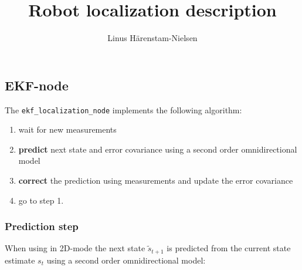 \documentclass[a4paper]{article}
\begin{document}
\title{Robot localization description}
\author {Linus Härenstam-Nielsen}
\maketitle


\subsection*{EKF-node}
The \texttt{ekf\_localization\_node} implements the following algorithm:
\begin{enumerate}
	\item wait for new measurements
	\item \textbf{predict} next state and error covariance using a second order omnidirectional model 
	\item \textbf{correct} the prediction using measurements and update the error covariance
	\item go to step 1.
\end{enumerate}

\subsubsection*{Prediction step}
When using  in 2D-mode the next state $\tilde{s}_{t+1}$ is predicted from the current state estimate $s_t$ using a second order omnidirectional model:
\end{document}
